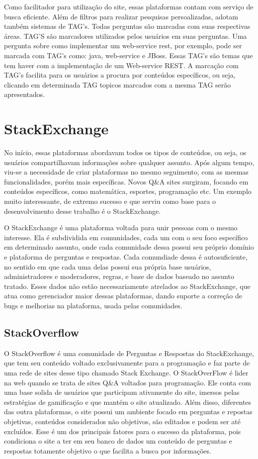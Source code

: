 Como facilitador para utilização do site, essas plataformas contam com serviço de busca eficiente. Além de filtros para realizar pesquisas persoalizadas, adotam também sistemas de TAG's. Todas perguntas são marcadas com suas respectivas áreas.
TAG'S são marcadores utilizados pelos usuários em suas perguntas. Uma pergunta sobre como implementar um web-service rest, por exemplo, pode ser marcada com TAG's como: java, web-service e JBoss. Essas TAG's são temas que tem haver com a implementação de 
um Web-service REST. A marcação com TAG's facilita para os usuários a procura por conteúdos específicos, ou seja, clicando em determinada TAG topicos marcados com a mesma TAG serão apresentados.

\section{StackExchange}%

No início, essas plataformas abordavam todos os tipos de conteúdos, ou seja, os usuários compartilhavam informações sobre qualquer assunto. Após algum tempo, viu-se a necessidade de criar plataformas no mesmo seguimento, com as mesmas
 funcionalidades, porém mais específicas. Novos Q\&A sites surgiram, focando em conteúdos específicos, como matemática, esportes, programação etc. Um exemplo muito interessante, de extremo sucesso e que serviu como base para o desenvolvimento
 desse trabalho é o StackExchange.

O StackExchange é uma plataforma voltada para unir pessoas com o mesmo interesse. Ela é subdividida em comunidades, cada um com o seu foco específico em determinado assunto, onde cada comunidade dessa possui seu próprio domínio e plataforma de perguntas e respostas. Cada comundiade dessa é autosuficiente, no sentido em que cada uma delas possui sua própria base usuários, administradores e moderadores, regras, e base de dados baseado no assunto tratado. Esses dados não estão necessariamente atrelados ao StackExchange, que atua como gerenciador maior dessas plataformas, dando suporte a correção de bugs e melhorias na plataforma, usada pelas comunidades.


\subsection{StackOverflow}%

O StackOverflow é uma comunidade de Perguntas e Respostas do StackExchange, que tem seu conteúdo voltado exclusivamente para a programação e faz parte de uma rede de sites desse tipo chamado Stack Exchange. O StackOverFlow é lider na web quando se trata de sites Q\&A voltados para programação.
Ele conta com uma base solida de usuários que participam ativamente do site, imersos pelas estratégias de gamificação e que mantém o site atualizado. Além disso, diferentes das outra plataformas, o site possui um ambiente focado em perguntas e repostas objetivas,
conteúdos considerados não objetivos, são editados e podem ser até excluídos. Esse é um dos principais fatores para o sucesso da plataforma, pois condiciona o site  a ter em seu banco de dados um conteúdo de perguntas e respostas totamente objetivo o que facilita
 a busca por informações. 


